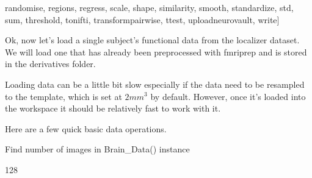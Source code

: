 \documentclass[letterpaper,10pt,english]{sphinxmanual}
\begin{document}
\begin{sphinxVerbatim}[commandchars=\\\{\}]
\PYGZsq{}randomise\PYGZsq{}, \PYGZsq{}regions\PYGZsq{}, \PYGZsq{}regress\PYGZsq{}, \PYGZsq{}scale\PYGZsq{}, \PYGZsq{}shape\PYGZsq{}, \PYGZsq{}similarity\PYGZsq{}, \PYGZsq{}smooth\PYGZsq{}, \PYGZsq{}standardize\PYGZsq{}, \PYGZsq{}std\PYGZsq{}, \PYGZsq{}sum\PYGZsq{}, \PYGZsq{}threshold\PYGZsq{}, \PYGZsq{}to\PYGZus{}nifti\PYGZsq{}, \PYGZsq{}transform\PYGZus{}pairwise\PYGZsq{}, \PYGZsq{}ttest\PYGZsq{}, \PYGZsq{}upload\PYGZus{}neurovault\PYGZsq{}, \PYGZsq{}write\PYGZsq{}]
\end{sphinxVerbatim}

Ok, now let’s load a single subject’s functional data from the localizer dataset. We will load one that has already been preprocessed with fmriprep and is stored in the derivatives folder.

Loading data can be a little bit slow especially if the data need to be resampled to the template, which is set at \(2mm^3\) by default. However, once it’s loaded into the workspace it should be relatively fast to work with it.

\begin{sphinxVerbatim}[commandchars=\\\{\}]
      \PYG{p}{[}\PYG{p}{]}
\end{sphinxVerbatim}

Here are a few quick basic data operations.

Find number of images in Brain\_Data() instance

\begin{sphinxVerbatim}[commandchars=\\\{\}]
\end{sphinxVerbatim}

\begin{sphinxVerbatim}[commandchars=\\\{\}]
128
\end{sphinxVerbatim}
\end{document}
